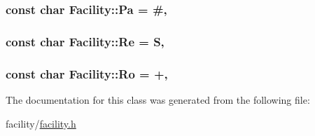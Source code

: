 \subsubsection[{\texorpdfstring{Pa}{Pa}}]{\setlength{\rightskip}{0pt plus 5cm}const char Facility\+::\+Pa = \textquotesingle{}\#\textquotesingle{}\hspace{0.3cm}{\ttfamily [static]}, {\ttfamily [protected]}}\hypertarget{classFacility_a5588f173a18205498f4c3bfd3c04d28c}{}\label{classFacility_a5588f173a18205498f4c3bfd3c04d28c}
\subsubsection[{\texorpdfstring{Re}{Re}}]{\setlength{\rightskip}{0pt plus 5cm}const char Facility\+::\+Re = \textquotesingle{}S\textquotesingle{}\hspace{0.3cm}{\ttfamily [static]}, {\ttfamily [protected]}}\hypertarget{classFacility_a0c187566e945c796ffb5679d6c34287b}{}\label{classFacility_a0c187566e945c796ffb5679d6c34287b}
\subsubsection[{\texorpdfstring{Ro}{Ro}}]{\setlength{\rightskip}{0pt plus 5cm}const char Facility\+::\+Ro = \textquotesingle{}+\textquotesingle{}\hspace{0.3cm}{\ttfamily [static]}, {\ttfamily [protected]}}\hypertarget{classFacility_ac6279190b255cdb87040af59e849543a}{}\label{classFacility_ac6279190b255cdb87040af59e849543a}


The documentation for this class was generated from the following file\+:\begin{DoxyCompactItemize}
\item 
facility/\hyperlink{facility_8h}{facility.\+h}\end{DoxyCompactItemize}
